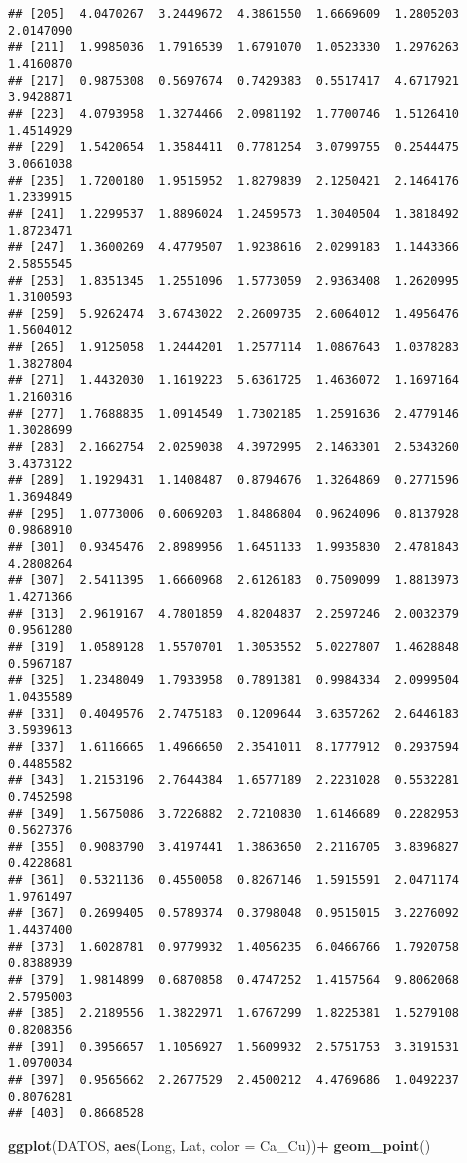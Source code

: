 \documentclass[
]{article}
\newenvironment{Shaded}{\begin{snugshade}}{\end{snugshade}}
\newcommand{\DataTypeTok}[1]{\textcolor[rgb]{0.13,0.29,0.53}{#1}}
\newcommand{\KeywordTok}[1]{\textcolor[rgb]{0.13,0.29,0.53}{\textbf{#1}}}
\newcommand{\NormalTok}[1]{#1}
\newcommand{\OperatorTok}[1]{\textcolor[rgb]{0.81,0.36,0.00}{\textbf{#1}}}
\newcommand{\StringTok}[1]{\textcolor[rgb]{0.31,0.60,0.02}{#1}}
\begin{document}
\begin{verbatim}
## [205]  4.0470267  3.2449672  4.3861550  1.6669609  1.2805203  2.0147090
## [211]  1.9985036  1.7916539  1.6791070  1.0523330  1.2976263  1.4160870
## [217]  0.9875308  0.5697674  0.7429383  0.5517417  4.6717921  3.9428871
## [223]  4.0793958  1.3274466  2.0981192  1.7700746  1.5126410  1.4514929
## [229]  1.5420654  1.3584411  0.7781254  3.0799755  0.2544475  3.0661038
## [235]  1.7200180  1.9515952  1.8279839  2.1250421  2.1464176  1.2339915
## [241]  1.2299537  1.8896024  1.2459573  1.3040504  1.3818492  1.8723471
## [247]  1.3600269  4.4779507  1.9238616  2.0299183  1.1443366  2.5855545
## [253]  1.8351345  1.2551096  1.5773059  2.9363408  1.2620995  1.3100593
## [259]  5.9262474  3.6743022  2.2609735  2.6064012  1.4956476  1.5604012
## [265]  1.9125058  1.2444201  1.2577114  1.0867643  1.0378283  1.3827804
## [271]  1.4432030  1.1619223  5.6361725  1.4636072  1.1697164  1.2160316
## [277]  1.7688835  1.0914549  1.7302185  1.2591636  2.4779146  1.3028699
## [283]  2.1662754  2.0259038  4.3972995  2.1463301  2.5343260  3.4373122
## [289]  1.1929431  1.1408487  0.8794676  1.3264869  0.2771596  1.3694849
## [295]  1.0773006  0.6069203  1.8486804  0.9624096  0.8137928  0.9868910
## [301]  0.9345476  2.8989956  1.6451133  1.9935830  2.4781843  4.2808264
## [307]  2.5411395  1.6660968  2.6126183  0.7509099  1.8813973  1.4271366
## [313]  2.9619167  4.7801859  4.8204837  2.2597246  2.0032379  0.9561280
## [319]  1.0589128  1.5570701  1.3053552  5.0227807  1.4628848  0.5967187
## [325]  1.2348049  1.7933958  0.7891381  0.9984334  2.0999504  1.0435589
## [331]  0.4049576  2.7475183  0.1209644  3.6357262  2.6446183  3.5939613
## [337]  1.6116665  1.4966650  2.3541011  8.1777912  0.2937594  0.4485582
## [343]  1.2153196  2.7644384  1.6577189  2.2231028  0.5532281  0.7452598
## [349]  1.5675086  3.7226882  2.7210830  1.6146689  0.2282953  0.5627376
## [355]  0.9083790  3.4197441  1.3863650  2.2116705  3.8396827  0.4228681
## [361]  0.5321136  0.4550058  0.8267146  1.5915591  2.0471174  1.9761497
## [367]  0.2699405  0.5789374  0.3798048  0.9515015  3.2276092  1.4437400
## [373]  1.6028781  0.9779932  1.4056235  6.0466766  1.7920758  0.8388939
## [379]  1.9814899  0.6870858  0.4747252  1.4157564  9.8062068  2.5795003
## [385]  2.2189556  1.3822971  1.6767299  1.8225381  1.5279108  0.8208356
## [391]  0.3956657  1.1056927  1.5609932  2.5751753  3.3191531  1.0970034
## [397]  0.9565662  2.2677529  2.4500212  4.4769686  1.0492237  0.8076281
## [403]  0.8668528
\end{verbatim}

\begin{Shaded}
\begin{Highlighting}[]
\KeywordTok{ggplot}\NormalTok{(DATOS, }\KeywordTok{aes}\NormalTok{(Long, Lat, }\DataTypeTok{color =}\NormalTok{ Ca_Cu))}\OperatorTok{+}
\StringTok{  }\KeywordTok{geom_point}\NormalTok{()}
\end{Highlighting}
\end{Shaded}
\end{document}
